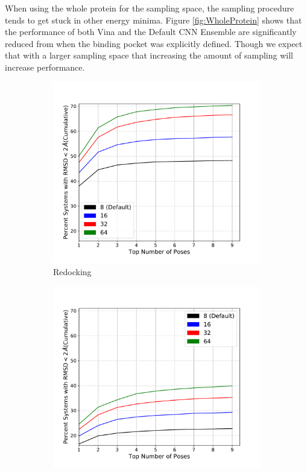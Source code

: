 \documentclass[journal=jcisd8,manuscript=article]{achemso}
\begin{document}
When using the whole protein for the sampling space, the sampling procedure tends to get stuck in other energy minima. Figure \ref{fig:WholeProtein} shows that the performance of both Vina and the Default CNN Ensemble are significantly reduced from when the binding pocket was explicitly defined. Though we expect that with a larger sampling space that increasing the amount of sampling will increase performance.
\begin{figure}    
        \begin{subfigure}[b]{0.48\textwidth}    
    		\centering
    		\includegraphics[width=\textwidth]{figures/redocking/whole_ptn_sweep_exhaustiveness_line.pdf}
    		\caption{Redocking}
                \label{fig:WholeProteinExhRD}
        \end{subfigure}    
        \begin{subfigure}[b]{0.48\textwidth}    
    		\centering
    		\includegraphics[width=\textwidth]{figures/crossdocking/whole_ptn_sweep_exhaustiveness_line.pdf}

\end{subfigure}
\end{figure}
\end{document}
